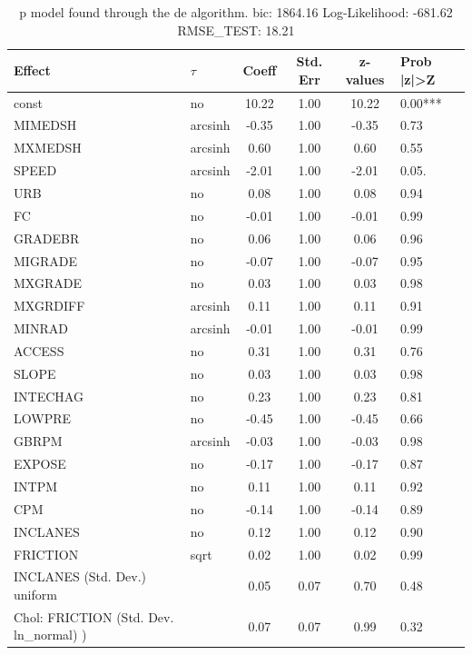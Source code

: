 \begin{table}
	\caption{p model found through the de algorithm. bic: 1864.16 Log-Likelihood: -681.62 RMSE_TEST: 18.21}
	\begin{center}
		\begin{tabular}{|l|l|c|c|c|l|}
			\hline
			Effect & $\tau$ & Coeff & Std. Err & z-values & Prob |z|>Z \\
			\hline
			const & no & 10.22 & 1.00 & 10.22 & 0.00*** \\
			\hline
			MIMEDSH & arcsinh & -0.35 & 1.00 & -0.35 & 0.73 \\
			\hline
			MXMEDSH & arcsinh & 0.60 & 1.00 & 0.60 & 0.55 \\
			\hline
			SPEED & arcsinh & -2.01 & 1.00 & -2.01 & 0.05. \\
			\hline
			URB & no & 0.08 & 1.00 & 0.08 & 0.94 \\
			\hline
			FC & no & -0.01 & 1.00 & -0.01 & 0.99 \\
			\hline
			GRADEBR & no & 0.06 & 1.00 & 0.06 & 0.96 \\
			\hline
			MIGRADE & no & -0.07 & 1.00 & -0.07 & 0.95 \\
			\hline
			MXGRADE & no & 0.03 & 1.00 & 0.03 & 0.98 \\
			\hline
			MXGRDIFF & arcsinh & 0.11 & 1.00 & 0.11 & 0.91 \\
			\hline
			MINRAD & arcsinh & -0.01 & 1.00 & -0.01 & 0.99 \\
			\hline
			ACCESS & no & 0.31 & 1.00 & 0.31 & 0.76 \\
			\hline
			SLOPE & no & 0.03 & 1.00 & 0.03 & 0.98 \\
			\hline
			INTECHAG & no & 0.23 & 1.00 & 0.23 & 0.81 \\
			\hline
			LOWPRE & no & -0.45 & 1.00 & -0.45 & 0.66 \\
			\hline
			GBRPM & arcsinh & -0.03 & 1.00 & -0.03 & 0.98 \\
			\hline
			EXPOSE & no & -0.17 & 1.00 & -0.17 & 0.87 \\
			\hline
			INTPM & no & 0.11 & 1.00 & 0.11 & 0.92 \\
			\hline
			CPM & no & -0.14 & 1.00 & -0.14 & 0.89 \\
			\hline
			INCLANES & no & 0.12 & 1.00 & 0.12 & 0.90 \\
			\hline
			FRICTION & sqrt & 0.02 & 1.00 & 0.02 & 0.99 \\
			\hline
			INCLANES (Std. Dev.) uniform &  & 0.05 & 0.07 & 0.70 & 0.48 \\
			\hline
			 Chol: FRICTION (Std. Dev. ln_normal) ) &  & 0.07 & 0.07 & 0.99 & 0.32 \\
			\hline
		\end{tabular}
	\end{center}
\end{table}